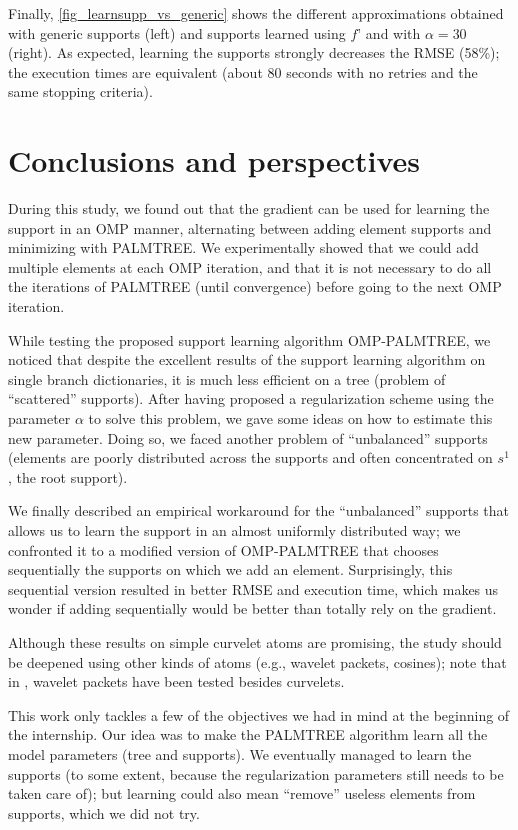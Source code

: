 Finally, \cref{fig_learnsupp_vs_generic} shows the different approximations obtained with generic supports (left) and supports learned using $f’$ and with $\alpha=30$ (right). As expected, learning the supports strongly decreases the RMSE (58\%); the execution times are equivalent (about 80 seconds with no retries and the same stopping criteria).


\FloatBarrier
\section{Conclusions and perspectives}

 
During this study, we found out that the gradient can be used for learning the support in an \ac{OMP} manner, alternating between adding element supports and minimizing with PALMTREE. We experimentally showed that we could add multiple elements at each OMP iteration, and that it is not necessary to do all the iterations of PALMTREE (until convergence) before going to the next OMP iteration. 

\noindent
While testing the proposed support learning algorithm OMP-PALMTREE, we noticed that despite the excellent results of the support learning algorithm on single branch dictionaries, it is much less efficient on a tree (problem of “scattered” supports). After having proposed a regularization scheme using the parameter $\alpha$ to solve this problem, we gave some ideas on how to estimate this new parameter. Doing so, we faced another problem of “unbalanced” supports (elements are poorly distributed across the supports and often concentrated on $s^1$, the root support). 

\noindent
We finally described an empirical workaround for the “unbalanced” supports that allows us to learn the support in an almost uniformly distributed way; we confronted it to a modified version of OMP-PALMTREE that chooses sequentially the supports on which we add an element. Surprisingly, this sequential version resulted in better RMSE and execution time, which makes us wonder if adding sequentially would be better than totally rely on the gradient.

\noindent
Although these results on simple curvelet atoms are promising, the study should be deepened using other kinds of atoms (e.g., wavelet packets, cosines); note that in \cite{chabiron_optimization_2016}, wavelet packets have been tested besides curvelets.

This work only tackles a few of the objectives we had in mind at the beginning of the internship. Our idea was to make the \ac{PALMTREE} algorithm learn all the model parameters (tree and supports). We eventually managed to learn the supports (to some extent, because the regularization parameters still needs to be taken care of); but learning could also mean “remove” useless elements from supports, which we did not try.
 
